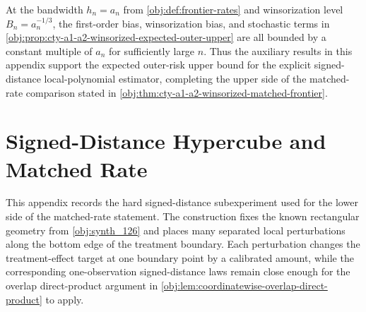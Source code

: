\documentclass[11pt]{article}
\begin{document}
At the bandwidth \(h_n=a_n\) from \cref{obj:def:frontier-rates} and winsorization level \(B_n=a_n^{-1/3}\), the first-order bias, winsorization bias, and stochastic terms in \cref{obj:prop:cty-a1-a2-winsorized-expected-outer-upper} are all bounded by a constant multiple of \(a_n\) for sufficiently large \(n\). Thus the auxiliary results in this appendix support the expected outer-risk upper bound for the explicit signed-distance local-polynomial estimator, completing the upper side of the matched-rate comparison stated in \cref{obj:thm:cty-a1-a2-winsorized-matched-frontier}.


\section{Signed-Distance Hypercube and Matched Rate}
\label{sec:app-signed-hypercube}

This appendix records the hard signed-distance subexperiment used for the lower side of the matched-rate statement. The construction fixes the known rectangular geometry from \cref{obj:synth_126} and places many separated local perturbations along the bottom edge of the treatment boundary. Each perturbation changes the treatment-effect target at one boundary point by a calibrated amount, while the corresponding one-observation signed-distance laws remain close enough for the overlap direct-product argument in \cref{obj:lem:coordinatewise-overlap-direct-product} to apply.
\end{document}
